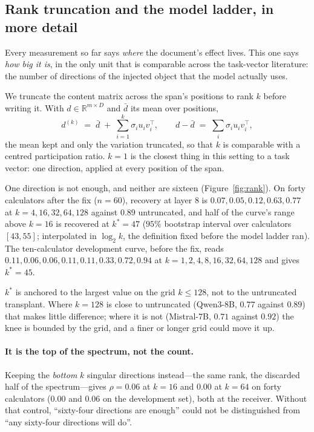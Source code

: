 \documentclass{article}
\newcommand{\dvec}{\ensuremath{d}}
\begin{document}
\subsection{Rank truncation and the model ladder, in more detail}
\label{app:rank2}

Every measurement so far says \emph{where} the document's effect lives. This one
says \emph{how big it is}, in the only unit that is comparable across the
task-vector literature: the number of directions of the injected object that the
model actually uses.

We truncate the content matrix across the span's positions to rank $k$ before
writing it. With $\dvec \in \mathbb{R}^{m \times D}$ and $\bar{\dvec}$ its mean
over positions,
\begin{equation}
\dvec^{(k)} \;=\; \bar{\dvec} \;+\; \sum_{i=1}^{k} \sigma_i u_i v_i^{\top},
\qquad
\dvec - \bar{\dvec} \;=\; \textstyle\sum_i \sigma_i u_i v_i^{\top},
\end{equation}
the mean kept and only the variation truncated, so that $k$ is comparable with a
centred participation ratio. $k=1$ is the closest thing in this setting to a
task vector: one direction, applied at every position of the span.

One direction is not enough, and neither are sixteen
(Figure~\ref{fig:rank}). On forty calculators after the fix ($n=60$), recovery
at layer $8$ is $0.07, 0.05, 0.12, 0.63, 0.77$ at $k = 4, 16, 32, 64, 128$
against $0.89$ untruncated, and half of the curve's range above $k=16$ is
recovered at $k^{*}=47$ ($95\%$ bootstrap interval over calculators $[43, 55]$;
interpolated in $\log_2 k$, the definition fixed before the model ladder ran).
The ten-calculator development curve, before the fix, reads
$0.11, 0.06, 0.06, 0.11, 0.11, 0.33, 0.72, 0.94$ at $k = 1,2,4,8,16,32,64,128$
and gives $k^{*}=45$.

$k^{*}$ is anchored to the largest value on the grid $k \le 128$, not to the
untruncated transplant. Where $k=128$ is close to untruncated (Qwen3-8B, $0.77$
against $0.89$) that makes little difference; where it is not (Mistral-7B,
$0.71$ against $0.92$) the knee is bounded by the grid, and a finer or longer
grid could move it up.

\paragraph{It is the top of the spectrum, not the count.} Keeping the
\emph{bottom} $k$ singular directions instead---the same rank, the discarded
half of the spectrum---gives $\rho = 0.06$ at $k=16$ and $0.00$ at $k=64$ on
forty calculators ($0.00$ and $0.06$ on the development set), both at the
receiver. Without that control, ``sixty-four directions are enough'' could not
be distinguished from ``any sixty-four directions will do''.
\end{document}
